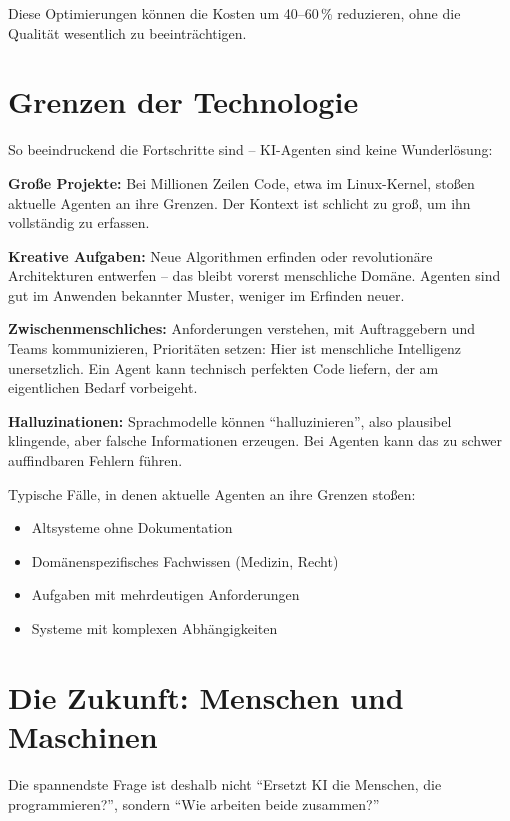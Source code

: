 Diese Optimierungen können die Kosten um 40--60\,\% reduzieren, ohne die Qualität wesentlich zu beeinträchtigen.


\section{Grenzen der Technologie}

So beeindruckend die Fortschritte sind – KI-Agenten sind keine Wunderlösung:

\textbf{Große Projekte:} Bei Millionen Zeilen Code, etwa im Linux-Kernel, stoßen aktuelle Agenten an ihre Grenzen. Der Kontext ist schlicht zu groß, um ihn vollständig zu erfassen.

\textbf{Kreative Aufgaben:} Neue Algorithmen erfinden oder revolutionäre Architekturen entwerfen – das bleibt vorerst menschliche Domäne. Agenten sind gut im Anwenden bekannter Muster, weniger im Erfinden neuer.

\textbf{Zwischenmenschliches:} Anforderungen verstehen, mit Auftraggebern und Teams kommunizieren, Prioritäten setzen: Hier ist menschliche Intelligenz unersetzlich. Ein Agent kann technisch perfekten Code liefern, der am eigentlichen Bedarf vorbeigeht.

\textbf{Halluzinationen:} Sprachmodelle können \enquote{halluzinieren}, also plausibel klingende, aber falsche Informationen erzeugen. Bei Agenten kann das zu schwer auffindbaren Fehlern führen.

\begin{infobox}
Typische Fälle, in denen aktuelle Agenten an ihre Grenzen stoßen:
\begin{itemize}
  \item Altsysteme ohne Dokumentation
  \item Domänenspezifisches Fachwissen (Medizin, Recht)
  \item Aufgaben mit mehrdeutigen Anforderungen
  \item Systeme mit komplexen Abhängigkeiten
\end{itemize}
\end{infobox}


\section{Die Zukunft: Menschen und Maschinen}

Die spannendste Frage ist deshalb nicht \enquote{Ersetzt KI die Menschen, die programmieren?}, sondern \enquote{Wie arbeiten beide zusammen?}

